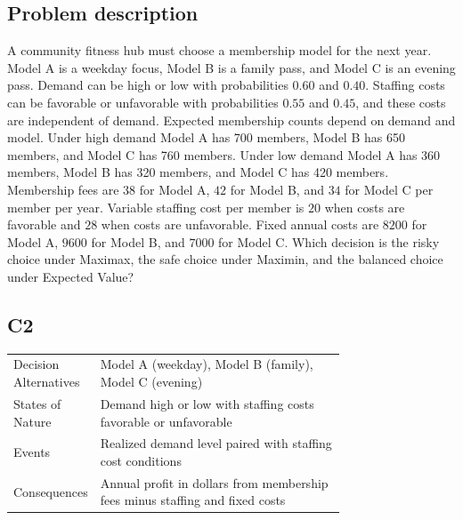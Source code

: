 \begin{ExamProblems}
		\subsection*{Problem description}
		A community fitness hub must choose a membership model for the next year. Model A is a weekday focus, Model B is a family pass, and Model C is an evening pass. Demand can be high or low with probabilities $0.60$ and $0.40$. Staffing costs can be favorable or unfavorable with probabilities $0.55$ and $0.45$, and these costs are independent of demand. Expected membership counts depend on demand and model. Under high demand Model A has 700 members, Model B has 650 members, and Model C has 760 members. Under low demand Model A has 360 members, Model B has 320 members, and Model C has 420 members. Membership fees are $38$ for Model A, $42$ for Model B, and $34$ for Model C per member per year. Variable staffing cost per member is $20$ when costs are favorable and $28$ when costs are unfavorable. Fixed annual costs are $8200$ for Model A, $9600$ for Model B, and $7000$ for Model C. Which decision is the risky choice under Maximax, the safe choice under Maximin, and the balanced choice under Expected Value?

		\subsection*{C2}
		\begin{center}
			\begin{tabular}{l p{0.74\linewidth}}
				\toprule
				Decision Alternatives & Model A (weekday), Model B (family), Model C (evening) \\
				States of Nature & Demand high or low with staffing costs favorable or unfavorable \\
				Events & Realized demand level paired with staffing cost conditions \\
				Consequences & Annual profit in dollars from membership fees minus staffing and fixed costs \\
				\bottomrule
			\end{tabular}
		\end{center}


\end{ExamProblems}
